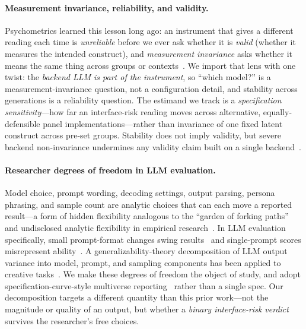 \documentclass[manuscript,nonacm]{acmart}
\begin{document}
\paragraph{Measurement invariance, reliability, and validity.} Psychometrics learned this lesson long ago:
an instrument that gives a different reading each time is \emph{unreliable} before we ever ask whether it
is \emph{valid} (whether it measures the intended construct), and \emph{measurement invariance} asks
whether it means the same thing across groups or contexts~\cite{santurkar2023whose,tjuatja2024llms}. We
import that lens with one twist: the \emph{backend LLM is part of the instrument}, so ``which model?'' is a
measurement-invariance question, not a configuration detail, and stability across generations is a
reliability question. The estimand
we track is a \emph{specification sensitivity}---how far an interface-risk reading moves across alternative,
equally-defensible panel implementations---rather than invariance of one fixed latent construct across
pre-set groups. Stability does
not imply validity, but severe backend non-invariance undermines any validity claim built on a single
backend~\cite{dominguez2024questioning}.

\paragraph{Researcher degrees of freedom in LLM evaluation.} Model choice, prompt wording, decoding
settings, output parsing, persona phrasing, and sample count are analytic choices that can each move a
reported result---a form of hidden flexibility analogous to the ``garden of forking paths'' and
undisclosed analytic flexibility in empirical research~\cite{simmons2011false}. In LLM evaluation
specifically, small prompt-format changes swing results~\cite{sclar2024quantifying} and single-prompt
scores misrepresent ability~\cite{mizrahi2024state}. A generalizability-theory decomposition of LLM output
variance into model, prompt, and sampling components has been applied to creative
tasks~\cite{haase2026within}. We make these degrees of freedom the object of study,
and adopt specification-curve-style multiverse reporting~\cite{simonsohn2020specification} rather than a
single spec. Our decomposition targets a different quantity than this prior work---not the magnitude or
quality of an output, but whether a \emph{binary interface-risk verdict} survives the researcher's free
choices.
\end{document}
